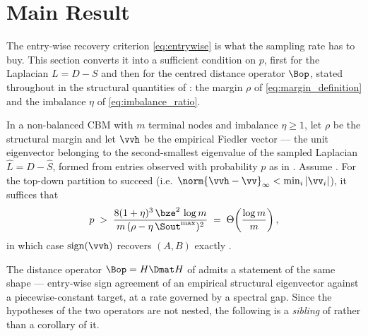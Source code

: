 %
%
\section{Main Result}\label{sec:main}
The entry-wise recovery criterion \eqref{eq:entrywise} is what the sampling rate
has to buy. This section converts it into a sufficient condition on $p$, first
for the Laplacian $L=D-S$ and then for the centred distance operator $\Bop$,
stated throughout in the structural quantities of : the
margin $\rho$ of \eqref{eq:margin_definition} and the imbalance $\eta$ of
\eqref{eq:imbalance_ratio}.

\begin{theorem}\label{thm:main-sim}
In a non-balanced CBM with $m$ terminal nodes and imbalance $\eta\ge1$, let $\rho$
be the structural margin and let $\vvh$ be the empirical Fiedler vector --- the
unit eigenvector belonging to the second-smallest eigenvalue of the sampled
Laplacian $\hat L=\hat D-\hat S$, formed from entries observed with probability
$p$ as in . Assume
. For the
top-down partition to succeed (i.e.\ $\norm{\vvh-\vv}_\infty<\min_i|\vv_i|$), it
suffices that
\begin{equation}\label{eq:main_rate}
   p\;>\;\frac{8(1+\eta)^3\,\bze^2\,\log m}{m\,(\rho-\eta\,\Sout^{\max})^2}
       \;=\;\Theta\!\left(\frac{\log m}{m}\right),
\end{equation}
in which case $\operatorname{sign}(\vvh)$ recovers $(A,B)$ exactly \hp.
\end{theorem}

\noindent The distance operator $\Bop=H\Dmat H$ of  admits a
statement of the same shape --- entry-wise sign agreement of an empirical
structural eigenvector against a piecewise-constant target, at a rate governed by
a spectral gap. Since the hypotheses of the two operators are not nested, the
following is a \emph{sibling} of  rather than a corollary of
it.
